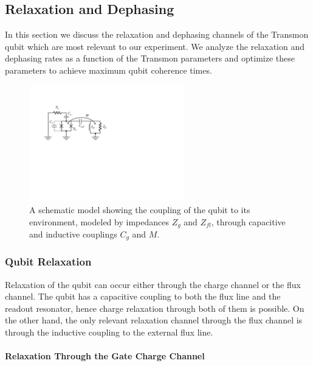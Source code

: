\subsection{Relaxation and Dephasing}

In this section we discuss the relaxation and dephasing channels of the Transmon qubit which are most relevant to our experiment. We analyze the relaxation and dephasing rates as a function of the Transmon parameters and optimize these parameters to achieve maximum qubit coherence times.

\begin{figure}
	\centering
	\includegraphics[width=0.6\textwidth]{./material/figures/introduction/cooper_pair_box_decoherence}
	\caption[]{A schematic model showing the coupling of the qubit to its environment, modeled by impedances $Z_g$ and $Z_{fl}$, through capacitive and inductive couplings $C_g$ and $M$.}
	\label{fig:cooper_pair_box_decoherence}
\end{figure}

\subsubsection{Qubit Relaxation}

Relaxation of the qubit can occur either through the charge channel or the flux channel. The qubit has a capacitive coupling to both the flux line and the readout resonator, hence charge relaxation through both of them is possible. On the other hand, the only relevant relaxation channel through the flux channel is through the inductive coupling to the external flux line.

\paragraph{Relaxation Through the Gate Charge Channel}


